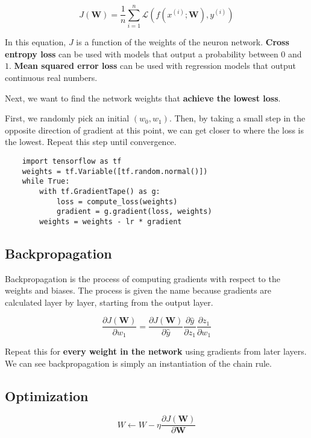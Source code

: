 \documentclass[12pt, a4paper, oneside]{article}
\begin{document}
\begin{equation*}
    J(\bm{W})=\frac{1}{n}\sum_{i=1}^{n}\mathcal{L}(f(x^{(i)};\bm{W}),y^{(i)})
\end{equation*}

In this equation, $J$ is a function of the weights of the neuron network. \textbf{Cross entropy loss} can be used with models that output a probability between $0$ and $1$. \textbf{Mean squared error loss} can be used with regression models that output continuous real numbers.

Next, we want to find the network weights that \textbf{achieve the lowest loss}. 

First, we randomly pick an initial $(w_{0},w_{1})$. Then, by taking a small step in the opposite direction of gradient at this point, we can get closer to where the loss is the lowest. Repeat this step until convergence.

\begin{lstlisting}
    import tensorflow as tf
    weights = tf.Variable([tf.random.normal()])
    while True:
        with tf.GradientTape() as g:
            loss = compute_loss(weights)
            gradient = g.gradient(loss, weights)
        weights = weights - lr * gradient
\end{lstlisting}

\subsection{Backpropagation}

Backpropagation is the process of computing gradients with respect to the weights and biases. The process is given the name because gradients are calculated layer by layer, starting from the output layer.

\begin{equation*}
    \frac{\partial J(\bm{W})}{\partial w_{1}}=\frac{\partial J(\bm{W})}{\partial \hat{y}}\frac{\partial\hat{y}}{\partial z_{1}}\frac{\partial z_{1}}{\partial w_{1}}
\end{equation*}

Repeat this for \textbf{every weight in the network} using gradients from later layers. We can see backpropagation is simply an instantiation of the chain rule.

\subsection{Optimization}

\begin{equation*}
    W\leftarrow W-\eta\frac{\partial J(\bm{W})}{\partial \bm{W}}
\end{equation*}
\end{document}
